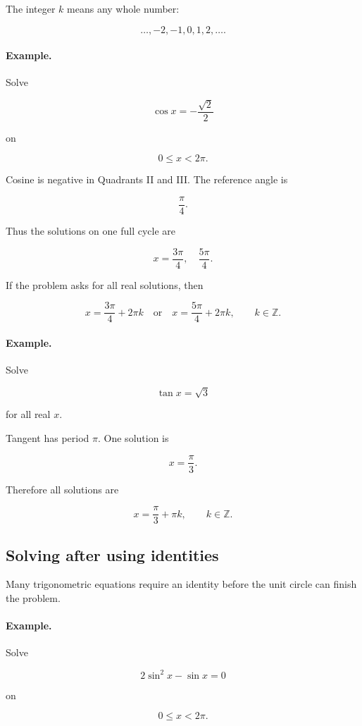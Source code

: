 The integer \(k\) means any whole number:

\[
\ldots,-2,-1,0,1,2,\ldots.
\]

\paragraph{Example.}
Solve

\[
\cos x=-\frac{\sqrt2}{2}
\]

on

\[
0\le x<2\pi.
\]

Cosine is negative in Quadrants II and III.  The reference angle is

\[
\frac{\pi}{4}.
\]

Thus the solutions on one full cycle are

\[
\boxed{
x=\frac{3\pi}{4},\quad \frac{5\pi}{4}.
}
\]

If the problem asks for all real solutions, then

\[
\boxed{
x=\frac{3\pi}{4}+2\pi k
\quad\text{or}\quad
x=\frac{5\pi}{4}+2\pi k,
\qquad k\in\mathbb Z.
}
\]

\paragraph{Example.}
Solve

\[
\tan x=\sqrt3
\]

for all real \(x\).

Tangent has period \(\pi\).  One solution is

\[
x=\frac{\pi}{3}.
\]

Therefore all solutions are

\[
\boxed{
x=\frac{\pi}{3}+\pi k,
\qquad k\in\mathbb Z.
}
\]

\subsection{Solving after using identities}
\label{appsubsec:solving-after-identities}

Many trigonometric equations require an identity before the unit circle can finish the
problem.

\paragraph{Example.}
Solve

\[
2\sin^2 x-\sin x=0
\]

on

\[
0\le x<2\pi.
\]

